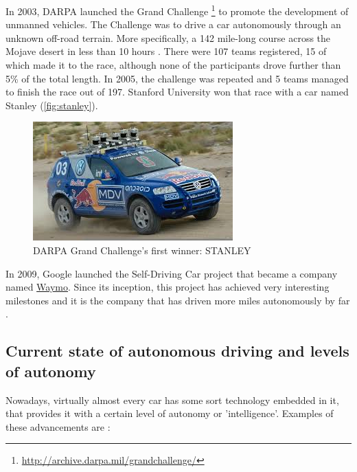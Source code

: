 In 2003, DARPA launched the Grand Challenge \footnote{\url{http://archive.darpa.mil/grandchallenge/}} to promote the development of unmanned vehicles. The Challenge was to drive a car autonomously through an unknown off-road terrain. More specifically, a 142 mile-long course across the Mojave desert in less than 10 hours  . There were 107 teams registered, 15 of which made it to the race, although none of the participants drove further than 5\% of the total length. In 2005, the challenge was repeated and 5 teams managed to finish the race out of 197. Stanford University won that race with a car named Stanley (\autoref{fig:stanley}).

\begin{figure}[htb]
  \centering
  \includegraphics[width=.9\linewidth]{pictures/01/stanley2}
  \caption{DARPA Grand Challenge's first winner: STANLEY}
  \label{fig:stanley}
\end{figure} 

In 2009, Google launched the Self-Driving Car project that became a company named \href{https://waymo.com/}{Waymo}. Since its inception, this project has achieved very interesting milestones and it is the company that has driven more miles autonomously by far .

\subsection{Current state of autonomous driving and levels of autonomy}

Nowadays, virtually almost every car has some sort technology embedded in it, that provides it with a certain level of autonomy or 'intelligence'. Examples of these advancements are :

